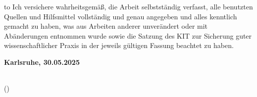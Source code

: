
\thispagestyle{empty}
\null\vfill
\noindent\hbox to \textwidth{\hrulefill} 
%
% 
%
{Ich versichere wahrheitsgemäß, die Arbeit selbstständig verfasst, alle benutzten 
Quellen und Hilfsmittel vollständig und genau angegeben und alles kenntlich gemacht 
zu haben, was aus Arbeiten anderer unverändert oder mit Abänderungen entnommen wurde 
sowie die Satzung des KIT zur Sicherung guter wissenschaftlicher Praxis in der 
jeweils gültigen Fassung beachtet zu haben. }
 
 
\textbf{Karlsruhe, 30.05.2025}
\vspace{1.5cm}
 
\dotfill\hspace*{8.0cm}\\
\hspace*{2cm}(\theauthor) 
\cleardoublepage